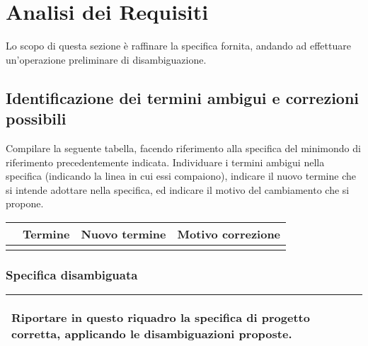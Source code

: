 \section{Analisi dei Requisiti}

\begin{templateblock}
    Lo scopo di questa sezione è raffinare la specifica fornita, andando ad
    effettuare un’operazione preliminare di disambiguazione.
\end{templateblock}

\subsection*{Identificazione dei termini ambigui e correzioni possibili}

\begin{templateblock}
    Compilare la seguente tabella, facendo riferimento alla specifica del
    minimondo di riferimento precedentemente indicata.
    Individuare i termini ambigui nella specifica
    (indicando la linea in cui essi compaiono), indicare il nuovo termine che
    si intende adottare nella specifica, ed indicare il motivo del cambiamento
    che si propone.
\end{templateblock}

\begin{tabularx}{\linewidth}{|l|l|l|X|}
    \hline
    \rowcolor{tblhdrcolor}
    \multicolumn{1}{|c|}{\textbf{Linea}}
     & \multicolumn{1}{|c|}{\textbf{Termine}}
     & \multicolumn{1}{|c|}{\textbf{Nuovo termine}}
     & \multicolumn{1}{|c|}{\textbf{Motivo correzione}}
    \\\hline
    \hfill
     & \hfill
     & \hfill
     & \hfill
    \\ \hline
\end{tabularx}

\subsubsection*{Specifica disambiguata}

\begin{tabularx}{\linewidth}{|X|}
    \hline
    \begin{templateblock}
        Riportare in questo riquadro la specifica di progetto corretta,
        applicando le disambiguazioni proposte.
    \end{templateblock}
    \\\hline
\end{tabularx}


